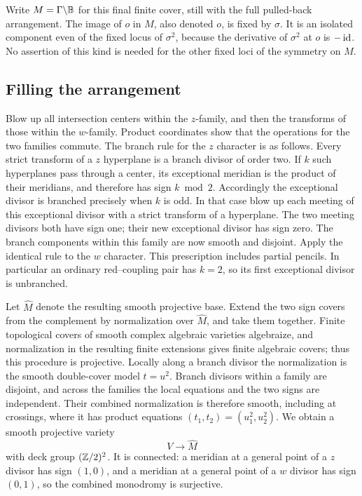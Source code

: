 Write $M=\Gamma\backslash\mathbb B$ for this final finite cover, still with
the full pulled-back arrangement.  The image of $o$ in $M$, also denoted
$o$, is fixed by $\sigma$.  It is an isolated component even of the
fixed locus of $\sigma^2$, because the derivative of $\sigma^2$ at $o$
is $-\operatorname{id}$.  No assertion of this kind is needed for the other fixed
loci of the symmetry on $M$.

\subsection{Filling the arrangement}\label{geo:fill}

Blow up all intersection centers within the $z$-family, and then the
transforms of those within the $w$-family.  Product coordinates show
that the operations for the two families commute.  The branch rule
for the $z$ character is as follows.  Every strict transform of a
$z$ hyperplane is a branch divisor of order two.  If $k$ such
hyperplanes pass through a center, its exceptional meridian is the
product of their meridians, and therefore has sign $k\bmod2$.
Accordingly the exceptional divisor is branched precisely when $k$
is odd.  In that case blow up each meeting of this exceptional divisor
with a strict transform of a hyperplane.  The two meeting divisors
both have sign one; their new exceptional divisor has sign zero.
The branch components within this family are now smooth and disjoint.
Apply the identical rule to the $w$ character.  This prescription
includes partial pencils.  In particular an ordinary red--coupling
pair has $k=2$, so its first exceptional divisor is unbranched.

Let $\widehat M$ denote the resulting smooth projective base.  Extend
the two sign covers from the complement by normalization over
$\widehat M$, and take them together.  Finite topological covers of
smooth complex algebraic varieties algebraize, and normalization in
the resulting finite extensions gives finite algebraic covers; thus
this procedure is projective.  Locally along a branch divisor the
normalization is the smooth double-cover model $t=u^2$.  Branch
divisors within a family are disjoint, and across the families the
local equations and the two signs are independent.  Their combined
normalization is therefore smooth, including at crossings, where it
has product equations $(t_1,t_2)=(u_1^2,u_2^2)$.  We obtain a smooth
projective variety
\begin{equation}\label{geo:V}
                 V\longrightarrow\widehat M
\end{equation}
with deck group $(\mathbb Z/2)^2$.  It is connected: a meridian at a general
point of a $z$ divisor has sign $(1,0)$, and a meridian at a general
point of a $w$ divisor has sign $(0,1)$, so the combined monodromy is
surjective.

